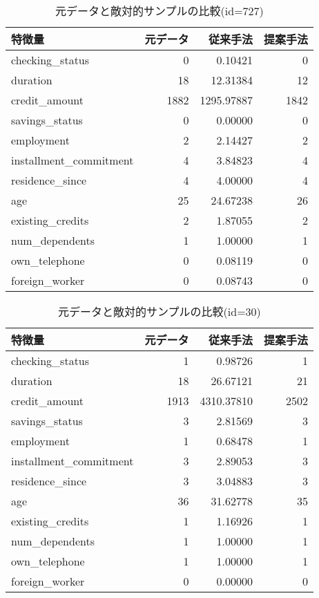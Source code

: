 \begin{table}[H]
    \centering
    \caption{元データと敵対的サンプルの比較(id=727)}
    \begin{tabular}{|l|r|r|r|} \hline
        特徴量 & 元データ & 従来手法 & 提案手法 \\ \hline
        checking\_status & 0 & 0.10421 & 0 \\ \hline
        duration & 18 & 12.31384 & 12 \\ \hline
        credit\_amount & 1882 & 1295.97887 & 1842 \\ \hline
        savings\_status & 0 & 0.00000 & 0 \\ \hline
        employment & 2 & 2.14427 & 2 \\ \hline
        installment\_commitment & 4 & 3.84823 & 4 \\ \hline
        residence\_since & 4 & 4.00000 & 4 \\ \hline
        age & 25 & 24.67238 & 26 \\ \hline
        existing\_credits & 2 & 1.87055 & 2 \\ \hline
        num\_dependents & 1 & 1.00000 & 1 \\ \hline
        own\_telephone & 0 & 0.08119 & 0 \\ \hline
        foreign\_worker & 0 & 0.08743 & 0 \\ \hline
    \end{tabular}
\end{table}

\begin{table}[H]
    \centering
    \caption{元データと敵対的サンプルの比較(id=30)}
    \begin{tabular}{|l|r|r|r|} \hline
        特徴量 & 元データ & 従来手法 & 提案手法 \\ \hline
        checking\_status & 1 & 0.98726 & 1 \\ \hline
        duration & 18 & 26.67121 & 21 \\ \hline
        credit\_amount & 1913 & 4310.37810 & 2502 \\ \hline
        savings\_status & 3 & 2.81569 & 3 \\ \hline
        employment & 1 & 0.68478 & 1 \\ \hline
        installment\_commitment & 3 & 2.89053 & 3 \\ \hline
        residence\_since & 3 & 3.04883 & 3 \\ \hline
        age & 36 & 31.62778 & 35 \\ \hline
        existing\_credits & 1 & 1.16926 & 1 \\ \hline
        num\_dependents & 1 & 1.00000 & 1 \\ \hline
        own\_telephone & 1 & 1.00000 & 1 \\ \hline
        foreign\_worker & 0 & 0.00000 & 0 \\ \hline
    \end{tabular}
\end{table}

